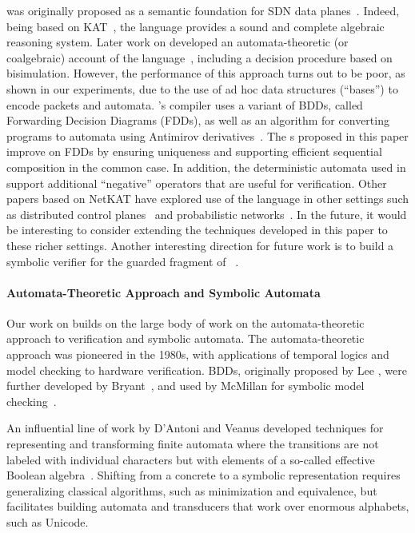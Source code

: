 \documentclass[acmsmall,dvipsnames,nonacm]{acmart}
\begin{document}
\NetKAT was originally proposed as a semantic foundation for SDN data
planes~\cite{Anderson2014}. Indeed, being based on
KAT~\cite{Kozen1996}, the language provides a sound and complete
algebraic reasoning system. Later work on \NetKAT developed an
automata-theoretic (or coalgebraic) account of the
language~\cite{Foster2015}, including a decision procedure based on
bisimulation. However, the performance of this approach turns out to
be poor, as shown in our experiments, due to the use of ad hoc data
structures (``bases'') to encode packets and automata. \NetKAT's
compiler uses a variant of BDDs, called Forwarding Decision Diagrams
(FDDs), as well as an algorithm for converting programs to automata
using Antimirov derivatives~\cite{Smolka2015}. The \SPPn{}s proposed
in this paper improve on FDDs by ensuring uniqueness and supporting
efficient sequential composition in the common case. In addition, the
deterministic automata used in \KATch support additional ``negative''
operators that are useful for verification. Other papers based on
NetKAT have explored use of the language in other settings such as
distributed control planes~\cite{Beckett2016} and probabilistic
networks~\cite{Foster2016,Smolka2017,Smolka2019}. In the future, it
would be interesting to consider extending the techniques developed in
this paper to these richer settings. Another interesting direction for
future work is to build a symbolic verifier for the guarded fragment
of \NetKAT~\cite{Smolka20}.

\paragraph*{Automata-Theoretic Approach and Symbolic Automata}
%
Our work on \KATch builds on the large body of work on the
automata-theoretic approach to verification and symbolic automata. The
automata-theoretic approach was pioneered in the 1980s, with
applications of temporal logics and model checking to hardware
verification. BDDs, originally proposed by Lee \cite{Lee1959}, were
further developed by Bryant~\cite{Bryant1986}, and used by McMillan
for symbolic model checking~\cite{Burch1990}.

An influential line of work by D'Antoni and Veanus developed
techniques for representing and transforming finite automata where the
transitions are not labeled with individual characters but with
elements of a so-called effective Boolean
algebra~\cite{DAntoni2014,DAntoni2017}. Shifting from a concrete to a
symbolic representation requires generalizing classical algorithms,
such as minimization and equivalence, but facilitates building
automata and transducers that work over enormous alphabets, such as
Unicode.
\end{document}
